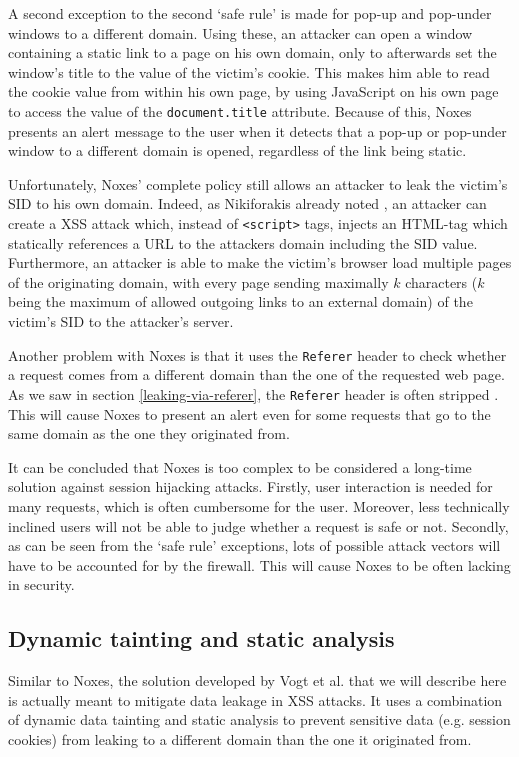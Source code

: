 A second exception to the second `safe rule' is made for pop-up and pop-under windows to a different domain. Using these, an attacker can open a window containing a static link to a page on his own domain, only to afterwards set the window's title to the value of the victim's cookie. This makes him able to read the cookie value from within his own page, by using JavaScript on his own page to access the value of the \texttt{document.title} attribute. Because of this, Noxes presents an alert message to the user when it detects that a pop-up or pop-under window to a different domain is opened, regardless of the link being static.

Unfortunately, Noxes' complete policy still allows an attacker to leak the victim's SID to his own domain. Indeed, as Nikiforakis already noted \cite{Nikiforakis2010}, an attacker can create a XSS attack which, instead of \texttt{<script>} tags, injects an HTML-tag which statically references a URL to the attackers domain including the SID value. Furthermore, an attacker is able to make the victim's browser load multiple pages of the originating domain, with every page sending maximally $k$ characters ($k$ being the maximum of allowed outgoing links to an external domain) of the victim's SID to the attacker's server.

Another problem with Noxes is that it uses the \texttt{Referer} header to check whether a request comes from a different domain than the one of the requested web page. As we saw in section \ref{leaking-via-referer}, the \texttt{Referer} header is often stripped \cite{Barth2008}. This will cause Noxes to present an alert even for some requests that go to the same domain as the one they originated from.

It can be concluded that Noxes is too complex to be considered a long-time solution against session hijacking attacks. Firstly, user interaction is needed for many requests, which is often cumbersome for the user. Moreover, less technically inclined users will not be able to judge whether a request is safe or not. Secondly, as can be seen from the `safe rule' exceptions, lots of possible attack vectors will have to be accounted for by the firewall. This will cause Noxes to be often lacking in security.

\subsection{Dynamic tainting and static analysis}

Similar to Noxes, the solution developed by Vogt et al. \cite{Vogt2007} that we will describe here is actually meant to mitigate data leakage in XSS attacks. It uses a combination of dynamic data tainting and static analysis to prevent sensitive data (e.g. session cookies) from leaking to a different domain than the one it originated from.

